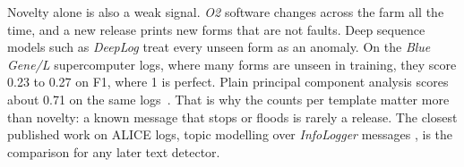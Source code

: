 Novelty alone is also a weak signal. \textit{O2} software changes across the farm all the time, and a new release prints new forms that are not faults. Deep sequence models such as \textit{DeepLog} treat every unseen form as an anomaly. On the \textit{Blue Gene/L} supercomputer logs, where many forms are unseen in training, they score 0.23 to 0.27 on F1, where 1 is perfect. Plain principal component analysis scores about 0.71 on the same logs~\cite{ref:sempca}. That is why the counts per template matter more than novelty: a known message that stops or floods is rarely a release. The closest published work on ALICE logs, topic modelling over \textit{InfoLogger} messages \cite{ref:aliceilad}, is the comparison for any later text detector.
